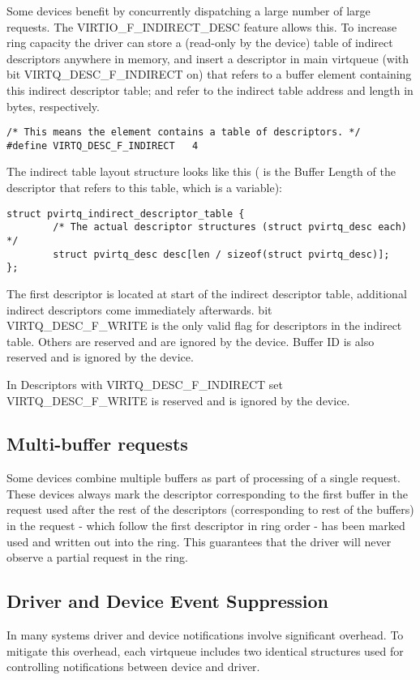 Some devices benefit by concurrently dispatching a large number
of large requests. The VIRTIO_F_INDIRECT_DESC feature allows this. To increase
ring capacity the driver can store a (read-only by the device) table of indirect
descriptors anywhere in memory, and insert a descriptor in main
virtqueue (with  bit VIRTQ_DESC_F_INDIRECT on) that refers to
a buffer element
containing this indirect descriptor table;  and 
refer to the indirect table address and length in bytes,
respectively.
\begin{lstlisting}
/* This means the element contains a table of descriptors. */
#define VIRTQ_DESC_F_INDIRECT   4
\end{lstlisting}

The indirect table layout structure looks like this
( is the Buffer Length of the descriptor that refers to this table,
which is a variable):

\begin{lstlisting}
struct pvirtq_indirect_descriptor_table {
        /* The actual descriptor structures (struct pvirtq_desc each) */
        struct pvirtq_desc desc[len / sizeof(struct pvirtq_desc)];
};
\end{lstlisting}

The first descriptor is located at start of the indirect
descriptor table, additional indirect descriptors come
immediately afterwards.  bit VIRTQ_DESC_F_WRITE is the
only valid flag for descriptors in the indirect table. Others
are reserved and are ignored by the device.
Buffer ID is also reserved and is ignored by the device.

In Descriptors with VIRTQ_DESC_F_INDIRECT set VIRTQ_DESC_F_WRITE
is reserved and is ignored by the device.

\subsection{Multi-buffer requests}
\label{sec:Packed Virtqueues / Multi-buffer requests}
Some devices combine multiple buffers as part of processing of a
single request.  These devices always mark the descriptor
corresponding to the first buffer in the request used after the
rest of the descriptors (corresponding to rest of the buffers) in
the request - which follow the first descriptor in ring order -
has been marked used and written out into the ring.  This
guarantees that the driver will never observe a partial request
in the ring.

\subsection{Driver and Device Event Suppression}
\label{sec:Packed Virtqueues / Driver and Device Event Suppression}
In many systems driver and device notifications involve
significant overhead. To mitigate this overhead,
each virtqueue includes two identical structures used for
controlling notifications between device and driver.

